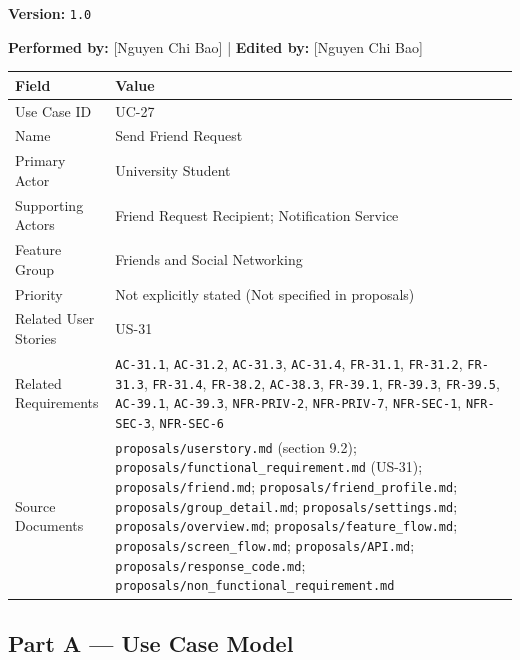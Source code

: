 \documentclass[12pt]{article}
\renewcommand{\baselinestretch}{1.5}
\begin{document}
\textbf{Version:} \texttt{1.0}
\par\medskip

\textbf{Performed by:} [Nguyen Chi Bao] | \textbf{Edited by:} [Nguyen Chi Bao]
\par\medskip

\begingroup
\small
\renewcommand{\baselinestretch}{1.0}\selectfont
\renewcommand{\arraystretch}{1.15}
\setlength{\tabcolsep}{6pt}
\begin{longtable}{|>{\raggedright\arraybackslash}p{}|>{\raggedright\arraybackslash}p{}|}
\hline
\textbf{Field} & \textbf{Value} \\ \hline
\endhead
Use Case ID & UC-27 \\ \hline
Name & Send Friend Request \\ \hline
Primary Actor & University Student \\ \hline
Supporting Actors & Friend Request Recipient; Notification Service \\ \hline
Feature Group & Friends and Social Networking \\ \hline
Priority & Not explicitly stated (Not specified in proposals) \\ \hline
Related User Stories & US-31 \\ \hline
Related Requirements & \texttt{AC-31.1}, \texttt{AC-31.2}, \texttt{AC-31.3}, \texttt{AC-31.4}, \texttt{FR-31.1}, \texttt{FR-31.2}, \texttt{FR-31.3}, \texttt{FR-31.4}, \texttt{FR-38.2}, \texttt{AC-38.3}, \texttt{FR-39.1}, \texttt{FR-39.3}, \texttt{FR-39.5}, \texttt{AC-39.1}, \texttt{AC-39.3}, \texttt{NFR-PRIV-2}, \texttt{NFR-PRIV-7}, \texttt{NFR-SEC-1}, \texttt{NFR-SEC-3}, \texttt{NFR-SEC-6} \\ \hline
Source Documents & \texttt{proposals/userstory.md} (section 9.2); \texttt{proposals/functional\_requirement.md} (US-31); \texttt{proposals/friend.md}; \texttt{proposals/friend\_profile.md}; \texttt{proposals/group\_detail.md}; \texttt{proposals/settings.md}; \texttt{proposals/overview.md}; \texttt{proposals/feature\_flow.md}; \texttt{proposals/screen\_flow.md}; \texttt{proposals/API.md}; \texttt{proposals/response\_code.md}; \texttt{proposals/non\_functional\_requirement.md} \\ \hline
\end{longtable}
\endgroup
\par\medskip

\hypertarget{sec:part-a-use-case-model}{}
\subsection*{Part A --- Use Case Model}
\par\medskip
\end{document}
